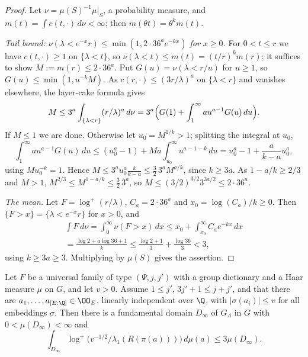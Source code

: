 \begin{proof}
Let $\nu=\mu(S)^{-1}\mu|_S$, a probability measure, and $m(t)=\int c(t,\cdot)\,d\nu<\infty$; then $m(\theta t)=\theta^km(t)$.

\emph{Tail bound: $\nu(\lambda<e^{-x}r)\le\min(1,2\cdot36^ae^{-kx})$ for $x\ge0$.} For $0<t\le r$ we have
$c(t,\cdot)\ge1$ on $\{\lambda<t\}$, so $\nu(\lambda<t)\le m(t)=(t/r)^km(r)$; it suffices to show $M:=m(r)\le2\cdot36^a$.
Put $G(u)=\nu(\lambda<r/u)$ for $u\ge1$, so $G(u)\le\min(1,u^{-k}M)$. As $c(r,\cdot)\le(3r/\lambda)^a$ on $\{\lambda<r\}$
and vanishes elsewhere, the layer-cake formula gives
\[
M\le3^a\int_{\{\lambda<r\}}(r/\lambda)^a\,d\nu=3^a\Bigl(G(1)+\int_1^\infty au^{a-1}G(u)\,du\Bigr).
\]
If $M\le1$ we are done. Otherwise let $u_0=M^{1/k}>1$; splitting the integral at $u_0$,
\[
\int_1^\infty au^{a-1}G(u)\,du\le(u_0^a-1)+Ma\int_{u_0}^\infty u^{a-1-k}\,du=u_0^a-1+\frac a{k-a}u_0^a,
\]
using $Mu_0^{-k}=1$. Hence $M\le3^au_0^a\frac k{k-a}\le\frac32\,3^aM^{a/k}$, since $k\ge3a$. As $1-a/k\ge2/3$ and $M>1$,
$M^{2/3}\le M^{1-a/k}\le\frac32\,3^a$, so $M\le(3/2)^{3/2}3^{3a/2}\le2\cdot36^a$.

\emph{The mean.} Let $F=\log^+(r/\lambda)$, $C_a=2\cdot36^a$ and $x_0=\log(C_a)/k\ge0$. Then $\{F>x\}=\{\lambda<e^{-x}r\}$ for
$x>0$, and
\begin{multline*}
\int F\,d\nu=\int_0^\infty\nu(F>x)\,dx\le x_0+\int_{x_0}^\infty C_ae^{-kx}\,dx\\
=\frac{\log2+a\log36+1}{k}\le\frac{\log2+1}3+\frac{\log36}3<3,
\end{multline*}
using $k\ge3a\ge3$. Multiplying by $\mu(S)$ gives the assertion.
\end{proof}

\begin{proposition}\label{pf:towergeo:fmin}
Let $F$ be a universal family of type $(\Psi,j,j')$ with a group dictionary and a Haar measure $\mu$ on $G$, and let
$v>0$. Assume $1\le j'$, $3j'+1\le j+j'$, and that there are $a_1,\dots,a_{[E:\Q]}\in\OO_E$, linearly independent over
$\Q$, with $|\sigma(a_i)|\le v$ for all embeddings $\sigma$. Then there is a fundamental domain $D_\infty$ of
$G_\Lambda$ in $G$ with $0<\mu(D_\infty)<\infty$ and
\[
\int_{D_\infty}\log^+\bigl(v^{-1/2}/\lambda_1(R(\pi(a)))\bigr)\,d\mu(a)\le3\mu(D_\infty).
\]
\end{proposition}


